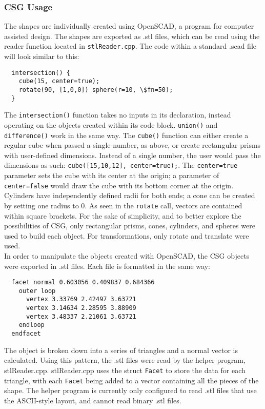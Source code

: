 \documentclass[12pt]{article}
\begin{document}
\begin{doublespace}
\subsubsection{CSG Usage}
The shapes are individually created using OpenSCAD, a program for computer assisted design. The shapes are exported as .stl files, which can be read using the reader function located in \texttt{stlReader.cpp}. The code within a standard .scad file will look similar to this:
\lstset{language=scad}
\begin{lstlisting}
  intersection() {
    cube(15, center=true);
    rotate(90, [1,0,0]) sphere(r=10, \$fn=50);
  }
\end{lstlisting}
The \texttt{intersection()} function takes no inputs in its declaration, instead operating on the objects created within its code block. \texttt{union()} and \texttt{difference()} work in the same way. The \texttt{cube()} function can either create a regular cube when passed a single number, as above, or create rectangular prisms with user-defined dimensions. Instead of a single number, the user would pass the dimensions as such: \texttt{cube([15,10,12], center=true);}. The \texttt{center=true} parameter sets the cube with its center at the origin; a parameter of \texttt{center=false} would draw the cube with its bottom corner at the origin. Cylinders have independently defined radii for both ends; a cone can be created by setting one radius to 0. As seen in the \texttt{rotate} call, vectors are contained within square brackets. For the sake of simplicity, and to better explore the possibilities of CSG, only rectangular prisms, cones, cylinders, and spheres were used to build each object. For transformations, only rotate and translate were used.\\

In order to manipulate the objects created with OpenSCAD, the CSG objects were exported in .stl files. Each file is formatted in the same way:
\begin{lstlisting}
  facet normal 0.603056 0.409837 0.684366
    outer loop
      vertex 3.33769 2.42497 3.63721
      vertex 3.14634 2.28595 3.88909
      vertex 3.48337 2.21061 3.63721
    endloop
  endfacet
\end{lstlisting}
The object is broken down into a series of triangles and a normal vector is calculated. Using this pattern, the .stl files were read by the helper program, stlReader.cpp. stlReader.cpp uses the struct \texttt{Facet} to store the data for each triangle, with each \texttt{Facet} being added to a vector containing all the pieces of the shape. The helper program is currently only configured to read .stl files that use the ASCII-style layout, and cannot read binary .stl files.\\


\end{doublespace}
\end{document}
